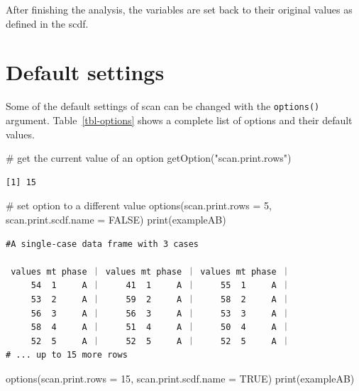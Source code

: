 \documentclass[
  letterpaper,
  DIV=11,
  numbers=noendperiod]{scrreprt}
\newenvironment{Shaded}{\begin{snugshade}}{\end{snugshade}}
\newcommand{\AttributeTok}[1]{\textcolor[rgb]{0.40,0.45,0.13}{#1}}
\newcommand{\CommentTok}[1]{\textcolor[rgb]{0.37,0.37,0.37}{#1}}
\newcommand{\ConstantTok}[1]{\textcolor[rgb]{0.56,0.35,0.01}{#1}}
\newcommand{\DecValTok}[1]{\textcolor[rgb]{0.68,0.00,0.00}{#1}}
\newcommand{\FunctionTok}[1]{\textcolor[rgb]{0.28,0.35,0.67}{#1}}
\newcommand{\NormalTok}[1]{\textcolor[rgb]{0.00,0.23,0.31}{#1}}
\newcommand{\StringTok}[1]{\textcolor[rgb]{0.13,0.47,0.30}{#1}}
\begin{document}
After finishing the analysis, the variables are set back to their
original values as defined in the scdf.

\hypertarget{default-settings}{%
\chapter{Default settings}\label{default-settings}}

Some of the default settings of scan can be changed with the
\texttt{options()} argument. Table~\ref{tbl-options} shows a complete
list of options and their default values.

\begin{Shaded}
\begin{Highlighting}[]
\CommentTok{\# get the current value of an option}
\FunctionTok{getOption}\NormalTok{(}\StringTok{"scan.print.rows"}\NormalTok{)}
\end{Highlighting}
\end{Shaded}

\begin{verbatim}
[1] 15
\end{verbatim}

\begin{Shaded}
\begin{Highlighting}[]
\CommentTok{\# set option to a different value}
\FunctionTok{options}\NormalTok{(}\AttributeTok{scan.print.rows =} \DecValTok{5}\NormalTok{, }\AttributeTok{scan.print.scdf.name =} \ConstantTok{FALSE}\NormalTok{)}
\FunctionTok{print}\NormalTok{(exampleAB)}
\end{Highlighting}
\end{Shaded}

\begin{verbatim}
#A single-case data frame with 3 cases

 values mt phase ｜ values mt phase ｜ values mt phase ｜
     54  1     A ｜     41  1     A ｜     55  1     A ｜
     53  2     A ｜     59  2     A ｜     58  2     A ｜
     56  3     A ｜     56  3     A ｜     53  3     A ｜
     58  4     A ｜     51  4     A ｜     50  4     A ｜
     52  5     A ｜     52  5     A ｜     52  5     A ｜
# ... up to 15 more rows
\end{verbatim}

\begin{Shaded}
\begin{Highlighting}[]
\FunctionTok{options}\NormalTok{(}\AttributeTok{scan.print.rows =} \DecValTok{15}\NormalTok{, }\AttributeTok{scan.print.scdf.name =} \ConstantTok{TRUE}\NormalTok{)}
\FunctionTok{print}\NormalTok{(exampleAB)}
\end{Highlighting}
\end{Shaded}
\end{document}
